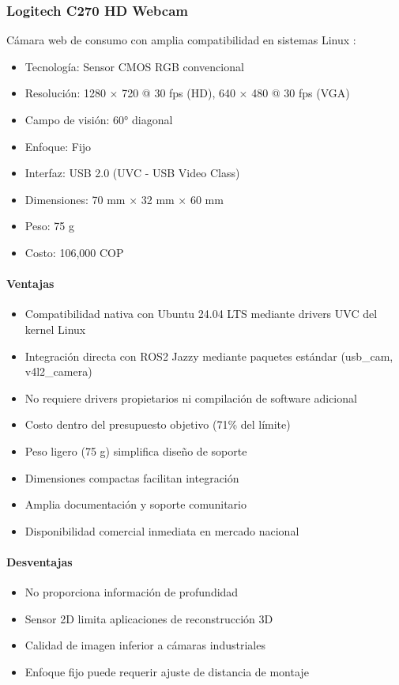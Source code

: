 \subsubsection{Logitech C270 HD Webcam}

Cámara web de consumo con amplia compatibilidad en sistemas Linux \cite{Logitech2024C270}:

\begin{itemize}
    \item Tecnología: Sensor CMOS RGB convencional
    \item Resolución: 1280 × 720 @ 30 fps (HD), 640 × 480 @ 30 fps (VGA)
    \item Campo de visión: 60° diagonal
    \item Enfoque: Fijo
    \item Interfaz: USB 2.0 (UVC - USB Video Class)
    \item Dimensiones: 70 mm × 32 mm × 60 mm
    \item Peso: 75 g
    \item Costo: 106,000 COP
\end{itemize}

\paragraph{Ventajas}
\begin{itemize}
    \item Compatibilidad nativa con Ubuntu 24.04 LTS mediante drivers UVC del kernel Linux
    \item Integración directa con ROS2 Jazzy mediante paquetes estándar (usb\_cam, v4l2\_camera) \cite{ROS2Camera2024}
    \item No requiere drivers propietarios ni compilación de software adicional
    \item Costo dentro del presupuesto objetivo (71\% del límite)
    \item Peso ligero (75 g) simplifica diseño de soporte
    \item Dimensiones compactas facilitan integración
    \item Amplia documentación y soporte comunitario
    \item Disponibilidad comercial inmediata en mercado nacional
\end{itemize}

\paragraph{Desventajas}
\begin{itemize}
    \item No proporciona información de profundidad
    \item Sensor 2D limita aplicaciones de reconstrucción 3D
    \item Calidad de imagen inferior a cámaras industriales
    \item Enfoque fijo puede requerir ajuste de distancia de montaje
\end{itemize}

